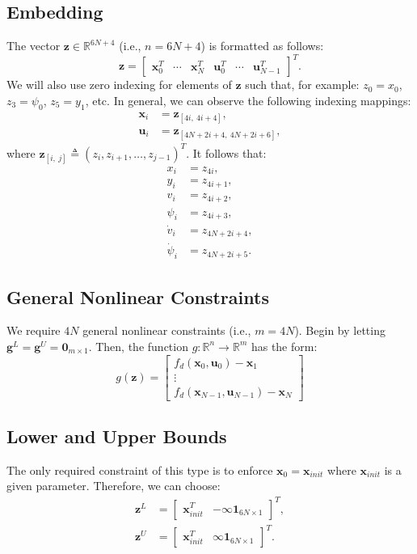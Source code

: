 \documentclass[12pt, letterpaper]{report}
\newcommand{\vect}[1]{\boldsymbol{\mathbf{#1}}}
\newcommand{\mat}[1]{\begin{bmatrix} #1 \end{bmatrix}}
\begin{document}
\subsection*{Embedding}
The vector $\vect{z} \in \mathbb{R}^{6N+4}$ (i.e., $n=6N+4$) is formatted as follows:
\begin{equation}
  \vect{z} = \mat{\vect{x}_0^T & \cdots & \vect{x}_{N}^T & \vect{u}_0^T
  & \cdots & \vect{u}_{N-1}^T}^T. 
\end{equation}
We will also use zero indexing for elements of $\vect{z}$ such that, for
example: $z_0 = x_0$, $z_3 = \psi_0$, $z_5 = y_1$, etc. In general, we
can observe the following indexing mappings:
\begin{subequations}
\begin{align}
  \vect{x}_i &= \vect{z}_{[4i,\ 4i + 4]},\\
  \vect{u}_i &= \vect{z}_{[4N + 2i + 4,\ 4N + 2i + 6]},
\end{align}
\end{subequations}
where $\vect{z}_{[i,\ j]} \triangleq (z_i, z_{i+1}, \ldots, z_{j-1})^T$.
It follows that:
\begin{subequations}
  \begin{align}
    x_i &= z_{4i},\\
    y_i &= z_{4i+1},\\
    v_i &= z_{4i+2},\\
    \psi_i &= z_{4i+3},\\
    \dot{v}_i &= z_{4N+2i+4},\\
    \dot{\psi}_i &= z_{4N+2i+5}.
  \end{align}
\end{subequations}
\subsection*{General Nonlinear Constraints}
We require $4N$ general nonlinear constraints (i.e., $m=4N$). Begin by
letting $\vect{g}^L = \vect{g}^U = \vect{0}_{m\times 1}$. Then, the
function $g:\mathbb{R}^{n}\rightarrow \mathbb{R}^m$ has the form:
\begin{equation}
  g(\vect{z}) = \mat{f_d(\vect{x}_0,\vect{u}_0) - \vect{x}_1 \\
  \vdots \\ f_d(\vect{x}_{N-1},\vect{u}_{N-1}) - \vect{x}_N}
\end{equation}

\subsection*{Lower and Upper Bounds}
The only required constraint of this type is to enforce $\vect{x}_0 =
\vect{x}_{init}$ where $\vect{x}_{init}$ is a given parameter.
Therefore, we can choose:
\begin{subequations}
  \begin{align}
    \vect{z}^L &= \mat{\vect{x}_{init}^T & -\infty\vect{1}_{6N\times
    1}}^T,\\
    \vect{z}^U &= \mat{\vect{x}_{init}^T & \infty\vect{1}_{6N\times
    1}}^T.
  \end{align}
\end{subequations}
\end{document}
